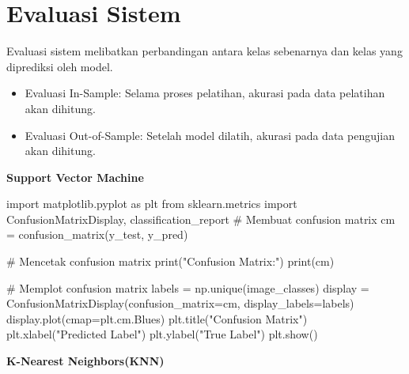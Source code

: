 \documentclass[
  letterpaper,
  DIV=11,
  numbers=noendperiod]{scrreprt}
\newenvironment{Shaded}{\begin{snugshade}}{\end{snugshade}}
\newcommand{\BuiltInTok}[1]{\textcolor[rgb]{0.00,0.23,0.31}{#1}}
\newcommand{\CommentTok}[1]{\textcolor[rgb]{0.37,0.37,0.37}{#1}}
\newcommand{\ImportTok}[1]{\textcolor[rgb]{0.00,0.46,0.62}{#1}}
\newcommand{\NormalTok}[1]{\textcolor[rgb]{0.00,0.23,0.31}{#1}}
\newcommand{\OperatorTok}[1]{\textcolor[rgb]{0.37,0.37,0.37}{#1}}
\newcommand{\StringTok}[1]{\textcolor[rgb]{0.13,0.47,0.30}{#1}}
\providecommand{\tightlist}{%
  \setlength{\itemsep}{0pt}\setlength{\parskip}{0pt}}\usepackage{longtable,booktabs,array}
\begin{document}
\hypertarget{evaluasi-sistem}{%
\section*{Evaluasi Sistem}\label{evaluasi-sistem}}


Evaluasi sistem melibatkan perbandingan antara kelas sebenarnya dan
kelas yang diprediksi oleh model.

\begin{itemize}
\tightlist
\item
  Evaluasi In-Sample: Selama proses pelatihan, akurasi pada data
  pelatihan akan dihitung.\\
\item
  Evaluasi Out-of-Sample: Setelah model dilatih, akurasi pada data
  pengujian akan dihitung.
\end{itemize}

\textbf{Support Vector Machine}

\begin{Shaded}
\begin{Highlighting}[]
\ImportTok{import}\NormalTok{ matplotlib.pyplot }\ImportTok{as}\NormalTok{ plt}
\ImportTok{from}\NormalTok{ sklearn.metrics }\ImportTok{import}\NormalTok{ ConfusionMatrixDisplay, classification\_report}
\CommentTok{\# Membuat confusion matrix}
\NormalTok{cm }\OperatorTok{=}\NormalTok{ confusion\_matrix(y\_test, y\_pred)}

\CommentTok{\# Mencetak confusion matrix}
\BuiltInTok{print}\NormalTok{(}\StringTok{"Confusion Matrix:"}\NormalTok{)}
\BuiltInTok{print}\NormalTok{(cm)}

\CommentTok{\# Memplot confusion matrix}
\NormalTok{labels }\OperatorTok{=}\NormalTok{ np.unique(image\_classes)}
\NormalTok{display }\OperatorTok{=}\NormalTok{ ConfusionMatrixDisplay(confusion\_matrix}\OperatorTok{=}\NormalTok{cm, display\_labels}\OperatorTok{=}\NormalTok{labels)}
\NormalTok{display.plot(cmap}\OperatorTok{=}\NormalTok{plt.cm.Blues)}
\NormalTok{plt.title(}\StringTok{"Confusion Matrix"}\NormalTok{)}
\NormalTok{plt.xlabel(}\StringTok{"Predicted Label"}\NormalTok{)}
\NormalTok{plt.ylabel(}\StringTok{"True Label"}\NormalTok{)}
\NormalTok{plt.show()}
\end{Highlighting}
\end{Shaded}

\textbf{K-Nearest Neighbors(KNN)}
\end{document}
